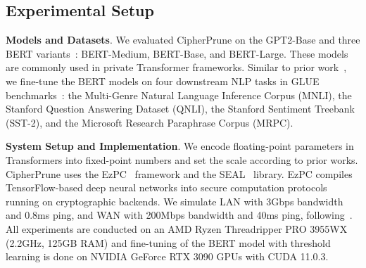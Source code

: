 \subsection{Experimental Setup}


\noindent\textbf{Models and Datasets}. We evaluated CipherPrune on the GPT2-Base and three BERT variants~\citep{devlin2018bert}: BERT-Medium, BERT-Base, and BERT-Large. These models are commonly used in private Transformer frameworks. Similar to prior work~\citep{pang2023bolt}, we fine-tune the BERT models on four downstream NLP tasks in GLUE benchmarks~\citep{wang2018glue}: the Multi-Genre Natural Language Inference Corpus (MNLI), the Stanford Question Answering Dataset (QNLI), the Stanford Sentiment Treebank (SST-2), and the Microsoft Research Paraphrase Corpus (MRPC).


\noindent\textbf{System Setup and Implementation}. We encode floating-point parameters in Transformers into fixed-point numbers and set the scale according to prior works\citep{hao2022iron-iron, lu2023bumblebee, pang2023bolt}. CipherPrune uses the EzPC~\citep{EzPC} framework and the SEAL~\citep{SEAL} library. EzPC compiles TensorFlow-based deep neural networks into secure computation protocols running on cryptographic backends. We simulate LAN with 3Gbps bandwidth and 0.8ms ping, and WAN with 200Mbps bandwidth and 40ms ping, following~\citep{pang2023bolt}. All experiments are conducted on an AMD Ryzen Threadripper PRO 3955WX (2.2GHz, 125GB RAM) and fine-tuning of the BERT model with threshold learning is done on NVIDIA GeForce RTX 3090 GPUs with CUDA 11.0.3. %



